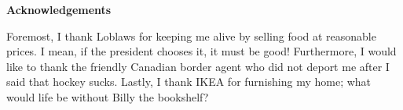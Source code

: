 \begin{center}\textbf{Acknowledgements}\end{center}

Foremost, I thank Loblaws for keeping me alive by selling food at reasonable prices.
I mean, if the president chooses it, it must be good!
Furthermore, I would like to thank the friendly Canadian border agent who did not deport me after I said that hockey sucks.
Lastly, I thank IKEA for furnishing my home; what would life be without Billy the bookshelf?

\vfill



\clearpage
